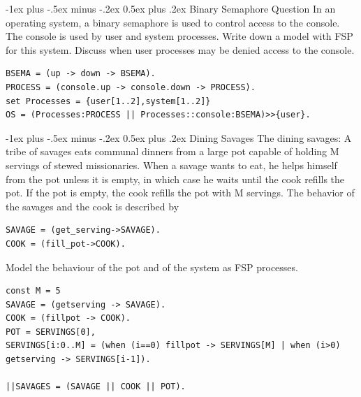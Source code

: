 \documentclass[letterpaper, 8pt]{extarticle}
\makeatletter
\renewcommand{\section}{\@startsection{section}{1}{0mm}%
                                {-1ex plus -.5ex minus -.2ex}%
                                {0.5ex plus .2ex}%
                                {\normalfont\normalsize\bfseries}}
\makeatother
\begin{document}
\begin{multicols*}{5}
  \section{Binary Semaphore Question}
  In an operating system, a binary semaphore is used to control access to the console. The console is used by user and system processes. Write down a model with FSP for this system. Discuss when user processes may be denied access to the console.
  \begin{lstlisting}
BSEMA = (up -> down -> BSEMA).
PROCESS = (console.up -> console.down -> PROCESS).
set Processes = {user[1..2],system[1..2]}
OS = (Processes:PROCESS || Processes::console:BSEMA)>>{user}.
\end{lstlisting}

  \section{Dining Savages}
  The dining savages: A tribe of savages eats communal dinners from a large pot capable of holding M servings of stewed missionaries. When a savage wants to eat, he helps himself from the pot unless it is empty, in which case he waits until the cook refills the pot. If the pot is empty, the cook refills the pot with M servings. The behavior of the savages and the cook is described by
  \begin{lstlisting}
SAVAGE = (get_serving->SAVAGE).
COOK = (fill_pot->COOK).
\end{lstlisting}
  Model the behaviour of the pot and of the system as FSP processes.
  \begin{lstlisting}
const M = 5
SAVAGE = (getserving -> SAVAGE).
COOK = (fillpot -> COOK).
POT = SERVINGS[0],
SERVINGS[i:0..M] = (when (i==0) fillpot -> SERVINGS[M] | when (i>0) getserving -> SERVINGS[i-1]).

||SAVAGES = (SAVAGE || COOK || POT).
\end{lstlisting}


\end{multicols*}
\end{document}
